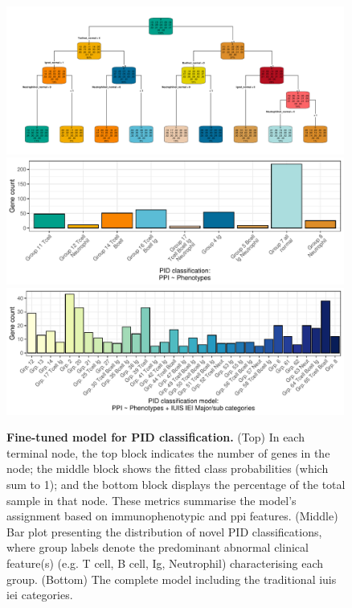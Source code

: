 \begin{figure}[ht]
  \centering
  \includegraphics[width=0.99\textwidth]{../images/p_new_classification_finetune_tree.pdf}       
  \includegraphics[width=0.99\textwidth]{../images/plot_new_pid_classifications_genetic.pdf}
  \includegraphics[width=0.99\textwidth]{../images/plot_multicat_new_pid_classes_combined.pdf}
  \caption{\textbf{ Fine-tuned model for PID classification.} 
  (Top) In each terminal node, the top block indicates the number of genes in the node; the middle block shows the fitted class probabilities (which sum to 1); and the bottom block displays the percentage of the total sample in that node. These metrics summarise the model's assignment based on immunophenotypic and \ac{ppi} features. (Middle) Bar plot presenting the distribution of novel PID classifications, where group labels denote the predominant abnormal clinical feature(s) (e.g. T cell, B cell, Ig, Neutrophil) characterising each group. (Bottom) The complete model including the traditional \ac{iuis} \ac{iei} categories.}  
  \label{fig:pid_class_tree_distribution}
\end{figure}


